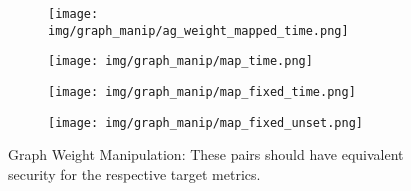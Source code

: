 \begin{figure}[ht]
    \begin{subfigure}[t]{.2\textwidth}
        \texttt{[image: img/graph\_manip/ag\_weight\_mapped\_time.png]}
        \caption{}
        \label{fig:gm_002}
    \end{subfigure}
    \begin{subfigure}[t]{0.2\textwidth}
        \texttt{[image: img/graph\_manip/map\_time.png]}
        \caption{} 
        \label{fig:gm_001}
    \end{subfigure}

    \vspace{.2cm}
    \centering
    \begin{subfigure}[t]{0.2\textwidth}
        \centering
        \texttt{[image: img/graph\_manip/map\_fixed\_time.png]}
        \caption{} 
        \label{fig:gm_003}
    \end{subfigure}
    \begin{subfigure}[t]{0.2\textwidth}
        \centering
        \texttt{[image: img/graph\_manip/map\_fixed\_unset.png]}
        \caption{} 
        \label{fig:gm_004}
    \end{subfigure}
    \hfill
    \caption{Graph Weight Manipulation: These pairs should have equivalent security for the respective target metrics.}
    \label{fig:mapGraph}
\end{figure}